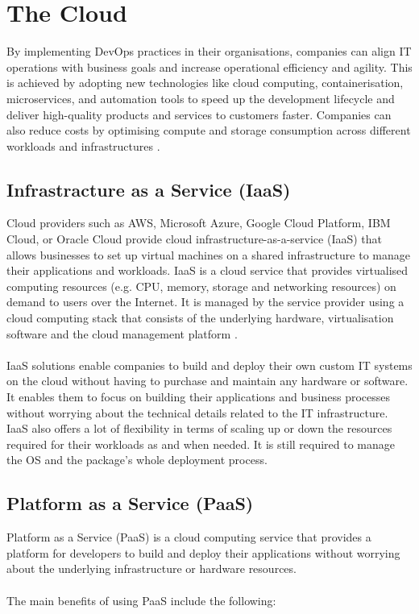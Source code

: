 \documentclass[BIF,Master,nenglish]{twbook}
\begin{document}
\section{The Cloud}
By implementing DevOps practices in their organisations, companies can align IT operations with business goals and increase operational efficiency and agility. This is achieved by adopting new technologies like cloud computing, containerisation, microservices, and automation tools to speed up the development lifecycle and deliver high-quality products and services to customers faster. Companies can also reduce costs by optimising compute and storage consumption across different workloads and infrastructures \cite{qia2009}.

\subsection{Infrastracture as a Service (IaaS)}
Cloud providers such as AWS, Microsoft Azure, Google Cloud Platform, IBM Cloud, or Oracle Cloud provide cloud infrastructure-as-a-service (IaaS) that allows businesses to set up virtual machines on a shared infrastructure to manage their applications and workloads. IaaS is a cloud service that provides virtualised computing resources (e.g. CPU, memory, storage and networking resources) on demand to users over the Internet. It is managed by the service provider using a cloud computing stack that consists of the underlying hardware, virtualisation software and the cloud management platform \cite{buy2019} .
\\
\\
IaaS solutions enable companies to build and deploy their own custom IT systems on the cloud without having to purchase and maintain any hardware or software. It enables them to focus on building their applications and business processes without worrying about the technical details related to the IT infrastructure. IaaS also offers a lot of flexibility in terms of scaling up or down the resources required for their workloads as and when needed. It is still required to manage the OS and the package's whole deployment process.

\subsection{Platform as a Service (PaaS)}
Platform as a Service (PaaS) is a cloud computing service that provides a platform for developers to build and deploy their applications without worrying about the underlying infrastructure or hardware resources. 
\\
\\
The main benefits of using PaaS include the following: 
\end{document}
